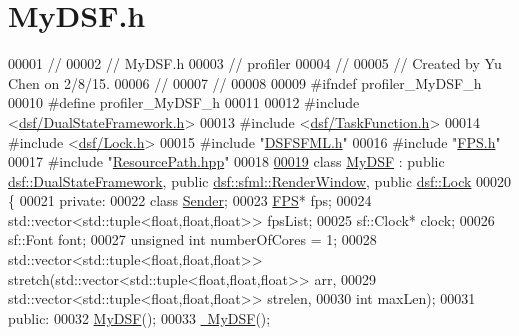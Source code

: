 \hypertarget{_my_d_s_f_8h_source}{}\section{My\+D\+S\+F.\+h}
\label{_my_d_s_f_8h_source}

\begin{DoxyCode}
00001 \textcolor{comment}{//}
00002 \textcolor{comment}{//  MyDSF.h}
00003 \textcolor{comment}{//  profiler}
00004 \textcolor{comment}{//}
00005 \textcolor{comment}{//  Created by Yu Chen on 2/8/15.}
00006 \textcolor{comment}{//}
00007 \textcolor{comment}{//}
00008 
00009 \textcolor{preprocessor}{#ifndef profiler\_MyDSF\_h}
00010 \textcolor{preprocessor}{#define profiler\_MyDSF\_h}
00011 
00012 \textcolor{preprocessor}{#include <\hyperlink{_dual_state_framework_8h}{dsf/DualStateFramework.h}>}
00013 \textcolor{preprocessor}{#include <\hyperlink{_task_function_8h}{dsf/TaskFunction.h}>}
00014 \textcolor{preprocessor}{#include <\hyperlink{_lock_8h}{dsf/Lock.h}>}
00015 \textcolor{preprocessor}{#include "\hyperlink{_d_s_f_s_f_m_l_8h}{DSFSFML.h}"}
00016 \textcolor{preprocessor}{#include "\hyperlink{_f_p_s_8h}{FPS.h}"}
00017 \textcolor{preprocessor}{#include "\hyperlink{_resource_path_8hpp}{ResourcePath.hpp}"}
00018 
\hypertarget{_my_d_s_f_8h_source_l00019}{}\hyperlink{class_my_d_s_f}{00019} \textcolor{keyword}{class }\hyperlink{class_my_d_s_f}{MyDSF} : \textcolor{keyword}{public} \hyperlink{classdsf_1_1_dual_state_framework}{dsf::DualStateFramework}, \textcolor{keyword}{public} 
      \hyperlink{classdsf_1_1sfml_1_1_render_window}{dsf::sfml::RenderWindow}, \textcolor{keyword}{public} \hyperlink{classdsf_1_1_lock}{dsf::Lock}
00020 \{
00021 \textcolor{keyword}{private}:
00022     \textcolor{keyword}{class }\hyperlink{class_my_d_s_f_1_1_sender}{Sender};
00023     \hyperlink{class_f_p_s}{FPS}* fps;
00024     std::vector<std::tuple<float,float,float>> fpsList;
00025     sf::Clock* clock;
00026     sf::Font font;
00027     \textcolor{keywordtype}{unsigned} \textcolor{keywordtype}{int} numberOfCores = 1;
00028     std::vector<std::tuple<float,float,float>> stretch(std::vector<std::tuple<float,float,float>> arr,
00029                                                        std::vector<std::tuple<float,float,float>> strelen,
00030                                                        \textcolor{keywordtype}{int} maxLen);
00031 \textcolor{keyword}{public}:
00032     \hyperlink{class_my_d_s_f_a7a674c56832e56804ef3f529b5ea8873}{MyDSF}();
00033     \hyperlink{class_my_d_s_f_a045f1ee7aab3f5259e93da63646d2265}{~MyDSF}();

\end{DoxyCode}
